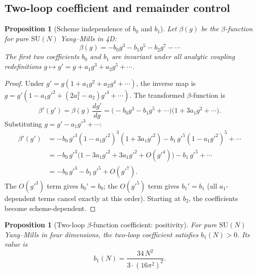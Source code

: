 \documentclass[11pt,a4paper]{amsart}
\newtheorem{proposition}[theorem]{Proposition}
\theoremstyle{definition}
\newcommand{\SU}{\mathrm{SU}}
\begin{document}
\subsection{Two-loop coefficient and remainder control}
\label{sec:two_loop}

\begin{proposition}[Scheme independence of $b_0$ and $b_1$]
\label{prop:scheme_independence}
Let $\beta(g)$ be the $\beta$-function for pure $\SU(N)$ Yang--Mills in 4D:
\begin{equation}\label{eq:beta_fn}
  \beta(g) = -b_0 g^3 - b_1 g^5 - b_2 g^7 - \cdots
\end{equation}
The first two coefficients $b_0$ and $b_1$ are invariant under all analytic
coupling redefinitions $g \mapsto g' = g + a_1 g^3 + a_2 g^5 + \cdots$.
\end{proposition}

\begin{proof}
Under $g' = g(1 + a_1 g^2 + a_2 g^4 + \cdots)$, the inverse map is
$g = g'(1 - a_1 g'^2 + (2a_1^2 - a_2) g'^4 + \cdots)$.
The transformed $\beta$-function is
\[
  \beta'(g') = \beta(g)\,\frac{dg'}{dg}
  = \bigl(-b_0 g^3 - b_1 g^5 + \cdots\bigr)
    \bigl(1 + 3a_1 g^2 + \cdots\bigr).
\]
Substituting $g = g' - a_1 g'^3 + \cdots$:
\begin{align*}
  \beta'(g') &= -b_0\,g'^3(1-a_1 g'^2)^3(1+3a_1 g'^2)
  - b_1\,g'^5(1-a_1 g'^2)^5 + \cdots \\
  &= -b_0\,g'^3\bigl(1 - 3a_1 g'^2 + 3a_1 g'^2 + O(g'^4)\bigr)
  - b_1\,g'^5 + \cdots \\
  &= -b_0\,g'^3 - b_1\,g'^5 + O(g'^7).
\end{align*}
The $O(g'^3)$ term gives $b_0' = b_0$; the $O(g'^5)$ term gives
$b_1' = b_1$ (all $a_1$-dependent terms cancel exactly at this order).
Starting at $b_2$, the coefficients become scheme-dependent.
\end{proof}

\begin{proposition}[Two-loop $\beta$-function coefficient: positivity]
\label{prop:two_loop}
For pure $\SU(N)$ Yang--Mills in four dimensions, the two-loop coefficient
satisfies $b_1(N) > 0$.  Its value is
\begin{equation}\label{eq:b1_value}
  b_1(N) = \frac{34\,N^2}{3\cdot(16\pi^2)^2}.
\end{equation}
\end{proposition}
\end{document}
